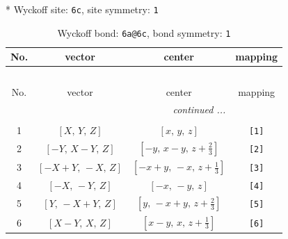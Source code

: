 \documentclass[fleqn,8pt]{jsarticle}
\begin{document}
* Wyckoff site: {\tt 6c}, site symmetry: {\tt 1}
\renewcommand{\arraystretch}{1.2}
\begin{longtable}{cccc}
\caption{Wyckoff bond: {\tt 6a@6c}, bond symmetry: {\tt 1}}
 \\
 \hline \hline
No. & vector & center & mapping \\ \hline \endfirsthead

\multicolumn{3}{l}{\tablename\ \thetable{}} \\
 \hline \hline
No. & vector & center & mapping \\ \hline \endhead

 \hline \hline
\multicolumn{3}{r}{\footnotesize\it continued ...} \\ \endfoot

 \hline \hline
\multicolumn{3}{r}{} \\ \endlastfoot

1 & $\left[ X,\, Y,\, Z \right]$ & $\left[ x,\, y,\, z \right]$ & {\tt [1]} \\ \hline
2 & $\left[ - Y,\, X - Y,\, Z \right]$ & $\left[ - y,\, x - y,\, z + \frac{2}{3} \right]$ & {\tt [2]} \\ \hline
3 & $\left[ - X + Y,\, - X,\, Z \right]$ & $\left[ - x + y,\, - x,\, z + \frac{1}{3} \right]$ & {\tt [3]} \\ \hline
4 & $\left[ - X,\, - Y,\, Z \right]$ & $\left[ - x,\, - y,\, z \right]$ & {\tt [4]} \\ \hline
5 & $\left[ Y,\, - X + Y,\, Z \right]$ & $\left[ y,\, - x + y,\, z + \frac{2}{3} \right]$ & {\tt [5]} \\ \hline
6 & $\left[ X - Y,\, X,\, Z \right]$ & $\left[ x - y,\, x,\, z + \frac{1}{3} \right]$ & {\tt [6]} \\
\end{longtable}
\end{document}
